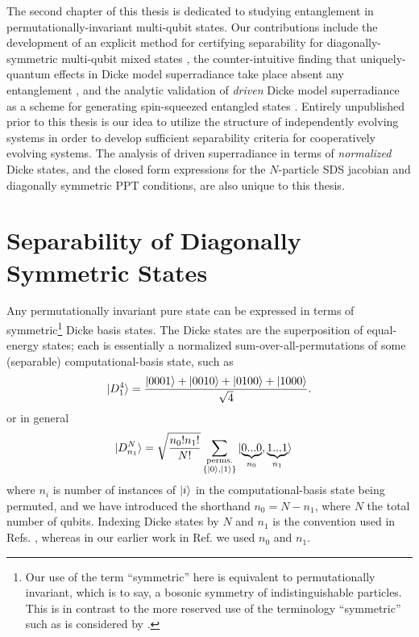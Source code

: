 \documentclass[
  12pt          %
  ,letterpaper  %
  ,center       %
  ,noupper      %
  ,english,fleqn]{uconnthesis}
\let\stdsection\section
\renewcommand\section{\newpage\stdsection}
\newcommand{\brackets}[1]{\lbrace{#1\rbrace}}
\begin{document}
The second chapter of this thesis is dedicated to studying entanglement in permutationally-invariant multi-qubit states. Our contributions include the development of an explicit method for certifying separability for diagonally-symmetric multi-qubit mixed states \cite{SuperradSeparable}, the counter-intuitive finding that uniquely-quantum effects in Dicke model superradiance take place absent any entanglement \cite{SuperradSeparable}, and the analytic validation of \emph{driven} Dicke model superradiance as a scheme for generating spin-squeezed entangled states \cite{DrivenSuperrad}. Entirely unpublished prior to this thesis is our idea to utilize the structure of independently evolving systems in order to develop sufficient separability criteria for cooperatively evolving systems. The analysis of driven superradiance in terms of \emph{normalized} Dicke states, and the closed form expressions for the $N$-particle SDS jacobian and diagonally symmetric PPT conditions,  are also unique to this thesis.



\section{Separability of Diagonally Symmetric States}

Any permutationally invariant pure state can be expressed in terms of symmetric\footnote{Our use of the term ``symmetric'' here is equivalent to permutationally invariant, which is to say, a bosonic symmetry of indistinguishable particles. This is in contrast to the more reserved use of the terminology ``symmetric'' such as is considered by \citet{SymmetricEquivalents}.} Dicke basis states. The Dicke states are the superposition of equal-energy states; each is essentially a normalized sum-over-all-permutations of
some (separable) computational-basis state, such as
\begin{align}\label{eq:exampleket}
\ket{D^4_{1}}=\frac{\ket{0001}+\ket{0010}+\ket{0100}+\ket{1000}}{\sqrt{4}}.
\end{align}
or in general
\begin{align}\label{eq:firstdef}
\renewcommand{\arraystretch}{0.5}
   \ket{D^N_{n_1}} &=\sqrt{\frac{n_0!n_1!}{N!}}\sum_{\begin{subarray}{c}\scriptstyle{\text{perms.}}\\ \scriptstyle{\brackets{\ket{0},\ket{1}}}\end{subarray}}{\ket{\underbrace{0...0}_{n_0},\underbrace{1...1}_{n_1}}}
\end{align}
where $n_i$ is number of instances of $\ket{i}$ in the computational-basis state being permuted, and we have introduced the shorthand $n_0=N-n_1$, where $N$ the total number of qubits. Indexing Dicke states by $N$ and $n_1$ is the convention used in Refs. \cite{BestSeparableQubits,AcinDetecting}, whereas in our earlier work in Ref. \cite{SuperradSeparable} we used $n_0$ and $n_1$.
\end{document}
